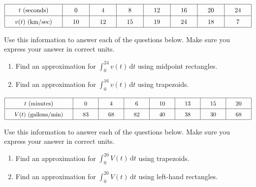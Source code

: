  \begin{align*}
    \arraycolsep=16.5pt\def\arraystretch{1.5}
    \begin{array}{|c|c|c|c|c|c|c|c|}
        \hline
        t \text{ (seconds)} & 0 & 4 & 8 & 12 & 16 & 20 & 24 \\ \hline
        v(t) \text{ (km/sec)} & 10 & 12 & 15 & 19 & 24 & 18 & 7 \\
        \hline
    \end{array}
\end{align*}

Use this information to answer each of the questions below. Make sure you express your answer in correct units.
\begin{enumerate}[label=\hspace{11pt}(\alph*), align=left, leftmargin=*, labelsep=0.25em]
    \item Find an approximation for $\int_0^{24} v(t) \,\mathrm{d}t$ using midpoint rectangles. 
    \item Find an approximation for $\int_0^{16} v(t) \,\mathrm{d}t$ using trapezoids. 
\end{enumerate} \vspace{11pt}

 \begin{align*}
    \arraycolsep=16.5pt\def\arraystretch{1.5}
    \begin{array}{|c|c|c|c|c|c|c|c|}
        \hline
        t \text{ (minutes)} & 0 & 4 & 6 & 10 & 13 & 15 & 20 \\ \hline
        V(t) \text{ (gallons/min)} & 83 & 68 & 82 & 40 & 38 & 30 & 68 \\
        \hline
    \end{array}
\end{align*}

Use this information to answer each of the questions below. Make sure you express your answer in correct units.
\begin{enumerate}[label=\hspace{11pt}(\alph*), align=left, leftmargin=*, labelsep=0.25em]
    \item Find an approximation for $\int_0^{20} V(t) \,\mathrm{d}t$ using trapezoids. 
    \item Find an approximation for $\int_0^{20} V(t) \,\mathrm{d}t$ using left-hand rectangles. 
\end{enumerate} \vspace{11pt}

